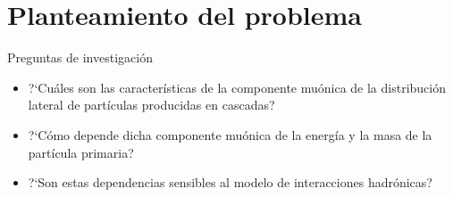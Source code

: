 \documentclass[10pt,xcolor=table]{beamer}
\begin{document}
	
	

\section{Planteamiento del problema}

\begin{frame}{Preguntas de investigación}
	\begin{itemize}
	\item ?`Cu\'ales son las caracter\'isticas de la componente mu\'onica de la distribuci\'on lateral de part\'iculas producidas en cascadas? \vspace{0.3 cm}
	\item ?`C\'omo depende dicha componente mu\'onica de la energ\'ia y la masa de la part\'icula primaria? \vspace{0.3 cm}
	\item ?`Son estas dependencias sensibles al modelo de interacciones hadr\'onicas?
	\end{itemize}
\end{frame}
\end{document}
